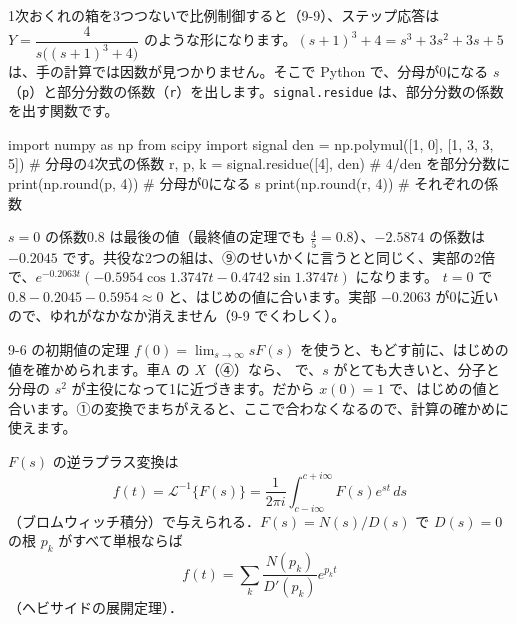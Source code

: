 1次おくれの箱を3つつないで比例制御すると（9-9）、ステップ応答は $Y=\dfrac{4}{s\bigl((s+1)^3+4\bigr)}$ のような形になります。$(s+1)^3+4=s^3+3s^2+3s+5$ は、手の計算では因数が見つかりません。そこで Python で、分母が0になる $s$（\texttt{p}）と部分分数の係数（\texttt{r}）を出します。\texttt{signal.residue} は、部分分数の係数を出す関数です。
\begin{bkcode}[Python]
import numpy as np
from scipy import signal
den = np.polymul([1, 0], [1, 3, 3, 5])   \# 分母の4次式の係数
r, p, k = signal.residue([4], den)       \# 4/den を部分分数に
print(np.round(p, 4))                    \# 分母が0になる s
print(np.round(r, 4))                    \# それぞれの係数
\end{bkcode}
\begin{bkcodeout}[実行結果]
[ 0.    +0.j     -0.2063+1.3747j -0.2063-1.3747j -2.5874+0.j    ]
[ 0.8   +0.j     -0.2977+0.2371j -0.2977-0.2371j -0.2045+0.j    ]
\end{bkcodeout}
$s=0$ の係数0.8 は最後の値（最終値の定理でも $\frac{4}{5}=0.8$）、$-2.5874$ の係数は $-0.2045$ です。共役な2つの組は、⑨のせいかくに言うとと同じく、実部の2倍で、$e^{-0.2063t}(-0.5954\cos1.3747t-0.4742\sin1.3747t)$ になります。
$t=0$ で $0.8-0.2045-0.5954\approx0$ と、はじめの値に合います。実部 $-0.2063$ が0に近いので、ゆれがなかなか消えません（9-9 でくわしく）。

\begin{motto}[5]
9-6 の初期値の定理 $\displaystyle f(0)=\lim_{s\to\infty}sF(s)$ を使うと、もどす前に、はじめの値を確かめられます。車A の $X$（④）なら、
で、$s$ がとても大きいと、分子と分母の $s^2$ が主役になって1に近づきます。だから $x(0)=1$ で、はじめの値と合います。①の変換でまちがえると、ここで合わなくなるので、計算の確かめに使えます。
\end{motto}

\begin{senmonsho}[逆ラプラス変換の専門書ふうの書き方]
\begin{bkhonbun}
$F(s)$ の逆ラプラス変換は
\[ f(t)=\mathcal{L}^{-1}\{F(s)\}=\frac{1}{2\pi i}\int_{c-i\infty}^{c+i\infty}F(s)e^{st}\,ds \]
（ブロムウィッチ積分）で与えられる．$F(s)=N(s)/D(s)$ で $D(s)=0$ の根 $p_k$ がすべて単根ならば
\[ f(t)=\sum_k\frac{N(p_k)}{D'(p_k)}e^{p_kt} \]
（ヘビサイドの展開定理）．
\end{bkhonbun}
\end{senmonsho}



